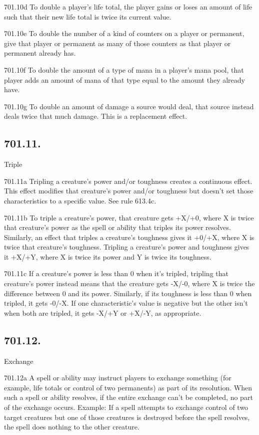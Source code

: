 701.10d To double a player’s life total, the player gains or loses an amount of life such that their new life total is twice its current value.

701.10e To double the number of a kind of counters on a player or permanent, give that player or permanent as many of those counters as that player or permanent already has.

701.10f To double the amount of a type of mana in a player’s mana pool, that player adds an amount of mana of that type equal to the amount they already have.

701.10g To double an amount of damage a source would deal, that source instead deals twice that much damage. This is a replacement effect.

\subsection*{701.11.}
Triple

701.11a Tripling a creature’s power and/or toughness creates a continuous effect. This effect modifies that creature’s power and/or toughness but doesn’t set those characteristics to a specific value. See rule 613.4c.

701.11b To triple a creature’s power, that creature gets +X/+0, where X is twice that creature’s power as the spell or ability that triples its power resolves. Similarly, an effect that triples a creature’s toughness gives it +0/+X, where X is twice that creature’s toughness. Tripling a creature’s power and toughness gives it +X/+Y, where X is twice its power and Y is twice its toughness.

701.11c If a creature’s power is less than 0 when it’s tripled, tripling that creature’s power instead means that the creature gets -X/-0, where X is twice the difference between 0 and its power. Similarly, if its toughness is less than 0 when tripled, it gets -0/-X. If one characteristic’s value is negative but the other isn’t when both are tripled, it gets -X/+Y or +X/-Y, as appropriate.

\subsection*{701.12.}
Exchange

701.12a A spell or ability may instruct players to exchange something (for example, life totals or control of two permanents) as part of its resolution. When such a spell or ability resolves, if the entire exchange can’t be completed, no part of the exchange occurs.
Example: If a spell attempts to exchange control of two target creatures but one of those creatures is destroyed before the spell resolves, the spell does nothing to the other creature.

